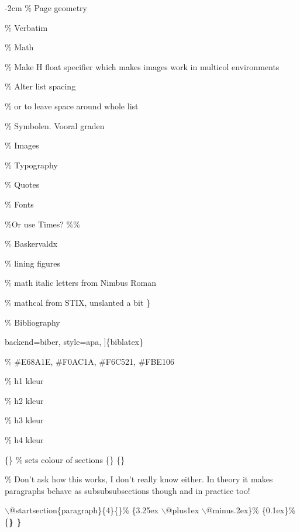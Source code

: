 \documentclass[11pt]{article}
\begin{document}
\begin{adjustwidth}{-2cm}{}
\% Page geometry
\usepackage[a4paper,margin=2cm, marginparwidth=1.6cm,marginparsep=0.2cm]{geometry}

\% Verbatim
\usepackage{verbatim}

\% Math
\usepackage{amsmath}

\% Make H float specifier which makes images work in multicol environments
\usepackage{float}

\% Alter list spacing
\usepackage{enumitem}
 \% or  to leave space around whole list

\% Symbolen. Vooral graden
\usepackage{gensymb}

\% Images
\usepackage{graphicx}
\% Typography
\usepackage{microtype}
  \% Quotes
\usepackage{csquotes}
  \% Fonts
  \usepackage[T1]{fontenc}
  \usepackage{wedn}
  \%Or use Times?
  \%\%\usepackage{mathptmx}
  \% Baskervaldx
  \iftrue
   \usepackage[lf]{Baskervaldx} \% lining figures
   \usepackage[bigdelims,vvarbb]{newtxmath} \% math italic letters from Nimbus Roman
   \usepackage[cal=boondoxo]{mathalfa} \% mathcal from STIX, unslanted a bit
   \renewcommand*\oldstylenums[1]\{\}
  \fi





\% Bibliography
\usepackage{[}
backend=biber,
style=apa,
]\{biblatex\}


\% \#E68A1E, \#F0AC1A, \#F6C521, \#FBE106

\% h1 kleur

\% h2 kleur

\% h3 kleur

\% h4 kleur

\sectionfont\{\color{Accent1}\}  \% sets colour of sections
\subsectionfont\{\color{Accent2}\}
\subsubsectionfont\{\color{Accent3}\}

\% Don't ask how this works, I don't really know either. In theory it makes paragraphs behave as subsubsubsections though and in practice too!
\setcounter{secnumdepth}{4}
\setcounter{tocdepth}{4}

\makeatletter
\renewcommand{\paragraph}\{
$\backslash$@startsection\{paragraph\}\{4\}\{\z@\}\%
                                    \{3.25ex $\backslash$@plus1ex $\backslash$@minus.2ex\}\%
                                    \{0.1ex\}\%
                                    \{\normalfont\small\bfseries\color{Accent4}\}
\}


\end{adjustwidth}
\end{document}
